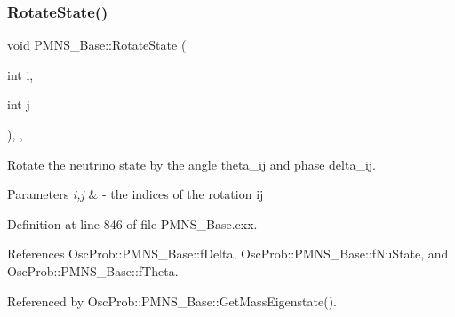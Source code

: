 \subsubsection{\texorpdfstring{Rotate\+State()}{RotateState()}}
{\footnotesize\ttfamily void P\+M\+N\+S\+\_\+\+Base\+::\+Rotate\+State (\begin{DoxyParamCaption}\item[{int}]{i,  }\item[{int}]{j }\end{DoxyParamCaption})\hspace{0.3cm}{\ttfamily [protected]}, {\ttfamily [virtual]}, {\ttfamily [inherited]}}

Rotate the neutrino state by the angle theta\+\_\+ij and phase delta\+\_\+ij.


\begin{DoxyParams}{Parameters}
{\em i,j} & -\/ the indices of the rotation ij \\
\hline
\end{DoxyParams}


Definition at line 846 of file P\+M\+N\+S\+\_\+\+Base.\+cxx.



References Osc\+Prob\+::\+P\+M\+N\+S\+\_\+\+Base\+::f\+Delta, Osc\+Prob\+::\+P\+M\+N\+S\+\_\+\+Base\+::f\+Nu\+State, and Osc\+Prob\+::\+P\+M\+N\+S\+\_\+\+Base\+::f\+Theta.



Referenced by Osc\+Prob\+::\+P\+M\+N\+S\+\_\+\+Base\+::\+Get\+Mass\+Eigenstate().


